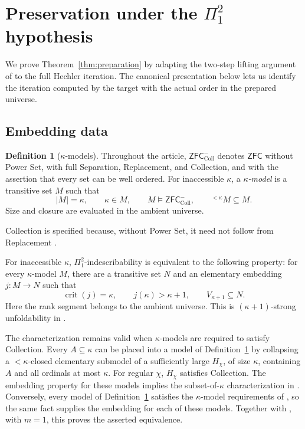 \documentclass[11pt,a4paper]{amsart}
\theoremstyle{definition}
\newtheorem{definition}[theorem]{Definition}
\theoremstyle{remark}
\newcommand{\ZFC}{\mathsf{ZFC}}
\newcommand{\ZFCc}{\mathsf{ZFC}^{-}_{\mathrm{Coll}}}
\DeclareMathOperator{\crit}{crit}
\begin{document}
\appendix
\section{Preservation under the
  \texorpdfstring{\(\Pi^2_1\)}{Pi-2-1} hypothesis}
\label{sec:preservation}

We prove Theorem~\ref{thm:preparation} by adapting the two-step
lifting argument of \cite[pp.~1229--1232]{Johnstone} to the
full Hechler iteration. The canonical presentation below lets
us identify the iteration computed by the target with the
actual order in the prepared universe.

\subsection{Embedding data}

\begin{definition}[\(\kappa\)-models]\label{def:kappa-model}
Throughout the article, \(\ZFCc\) denotes \(\ZFC\) without
Power Set, with full Separation, Replacement, and Collection,
and with the assertion that every set can be well ordered.
For inaccessible \(\kappa\), a \emph{\(\kappa\)-model} is a
transitive set \(M\) such that
\[
 |M|=\kappa,\qquad \kappa\in M,\qquad M\models\ZFCc,
 \qquad {}^{<\kappa}M\subseteq M.
\]
Size and closure are evaluated in the ambient universe.
\end{definition}

Collection is specified because, without Power Set, it need
not follow from Replacement \cite{GHJ}.

For inaccessible \(\kappa\), \(\Pi^2_1\)-indescribability
is equivalent to the following property: for every
\(\kappa\)-model \(M\), there are a transitive set \(N\)
and an elementary embedding \(j:M\to N\) such that
\[
 \crit(j)=\kappa,\qquad j(\kappa)>\kappa+1,
 \qquad V_{\kappa+1}\subseteq N.
\]
Here the rank segment belongs to the ambient universe. This is
\((\kappa+1)\)-strong unfoldability in
\cite[Definition 3 and Corollary 35]{Johnstone}.

The characterization remains valid when \(\kappa\)-models
are required to satisfy Collection.
Every \(A\subseteq\kappa\) can be placed into a model of
Definition~\ref{def:kappa-model} by collapsing a
\(<\kappa\)-closed elementary submodel of a sufficiently
large \(H_\chi\), of size \(\kappa\), containing \(A\)
and all ordinals at most \(\kappa\). For regular \(\chi\),
\(H_\chi\) satisfies Collection. The embedding property for
these models implies the subset-of-\(\kappa\)
characterization in \cite[Fact 4(4)]{Johnstone}. Conversely,
every model of Definition~\ref{def:kappa-model} satisfies
the \(\kappa\)-model requirements of \cite{Johnstone}, so the same
fact supplies the embedding for each of these models.
Together with \cite[Corollary 35]{Johnstone}, with \(m=1\),
this proves the asserted equivalence.
\end{document}
